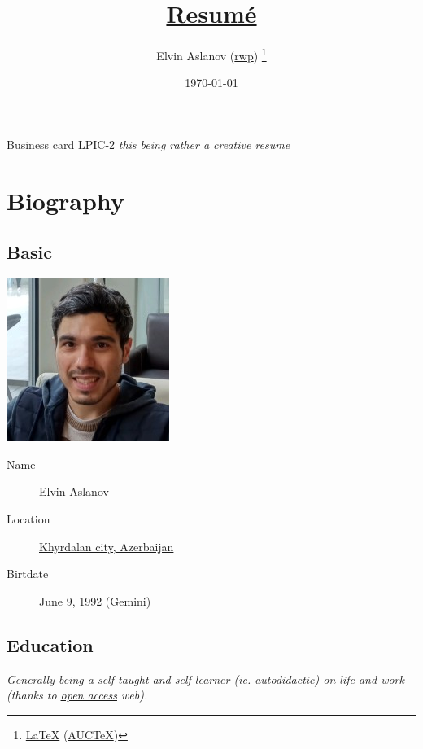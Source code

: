 \documentclass {article}
\title {\href{https://github.com/rwp0/resume}{Resumé}}
\author {Elvin Aslanov (\href{https://rwp0.github.io/}{rwp}) \thanks{\href{https://en.wikipedia.org/wiki/LaTeX}{\LaTeX} (\href{https://www.gnu.org/software/auctex/}{AUCTeX})}}
\date {\today}
\begin{document}
  \begin {titlepage}
    \maketitle
  \end {titlepage}
   {Business card}
   {LPIC-2}
  \textit {this being rather a creative resume}

  \section {Biography}

    \subsection {Basic}
    \includegraphics [scale = 0.5] {resume.jpg}
      \begin {description}
      \item [Name] \href{https://en.wiktionary.org/wiki/Elvin}{Elvin} \href{https://en.wiktionary.org/wiki/Aslan}{Aslan}ov
        \item [Location] \href{https://www.openstreetmap.org/way/186275017}{Khyrdalan city, Azerbaijan}
        \item [Birtdate] \href{https://www.timeanddate.com/date/durationresult.html?m1=06&d1=09&y1=1992}{June 9, 1992} (Gemini)
      \end {description}

    \subsection {Education}
      \textit {Generally being a self-taught and self-learner (ie. autodidactic) on life and work (thanks to \href{https://en.wikipedia.org/wiki/Open_access}{open access} web).}
\end{document}
